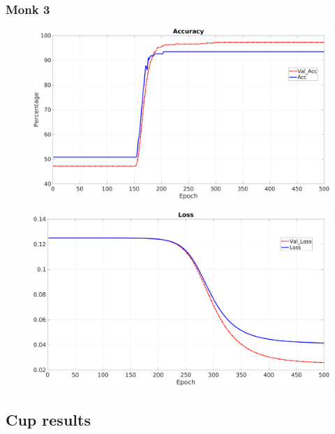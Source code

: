 \subsubsection{Monk 3}

\begin{figure}[H]
\includegraphics[scale=0.2]{img/Monk3_accuracy_Reg.png}
\caption{}
\end{figure}

\begin{figure}[H]
\includegraphics[scale=0.2]{img/Monk3_loss_Reg.png}
\caption{}
\end{figure}

\subsection{Cup results}